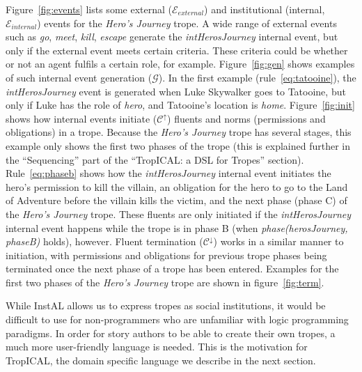 Figure~\ref{fig:events} lists some external ($\mathcal{E}_{external}$) and institutional (internal, $\mathcal{E}_{internal}$) events for the \emph{Hero's Journey} trope. A wide range of external events such as \emph{go}, \emph{meet}, \emph{kill}, \emph{escape} generate the \emph{intHerosJourney} internal event, but only if the external event meets certain criteria. These criteria could be whether or not an agent fulfils a certain role, for example. Figure~\ref{fig:gen} shows examples of such internal event generation ($\mathcal{G}$). In the first example (rule~\ref{eq:tatooine}), the \emph{intHerosJourney} event is generated when Luke Skywalker goes to Tatooine, but only if Luke has the role of \emph{hero}, and Tatooine's location is \emph{home}.
Figure~\ref{fig:init} shows how internal events initiate ($\mathcal{C^{\uparrow}}$) fluents and norms (permissions and obligations) in a trope. Because the \emph{Hero's Journey} trope has several stages, this example only shows the first two phases of the trope (this is explained further in the ``Sequencing'' part of the ``TropICAL: a DSL for Tropes'' section). Rule~\ref{eq:phaseb} shows how the \emph{intHerosJourney} internal event initiates the hero's permission to kill the villain, an obligation for the hero to go to the Land of Adventure before the villain kills the victim, and the next phase (phase C) of the \emph{Hero's Journey} trope. These fluents are only initiated if the \emph{intHerosJourney} internal event happens while the trope is in phase B (when \emph{phase(herosJourney, phaseB)} holds), however.
Fluent termination ($\mathcal{C^{\downarrow}}$) works in a similar manner to initiation, with permissions and obligations for previous trope phases being terminated once the next phase of a trope has been entered. Examples for the first two phases of the \emph{Hero's Journey} trope are shown in figure~\ref{fig:term}.

While InstAL allows us to express tropes as social institutions, it would be difficult to use for non-programmers who are unfamiliar with logic programming paradigms. In order for story authors to be able to create their own tropes, a much more user-friendly language is needed. This is the motivation for TropICAL, the domain specific language we describe in the next section.

